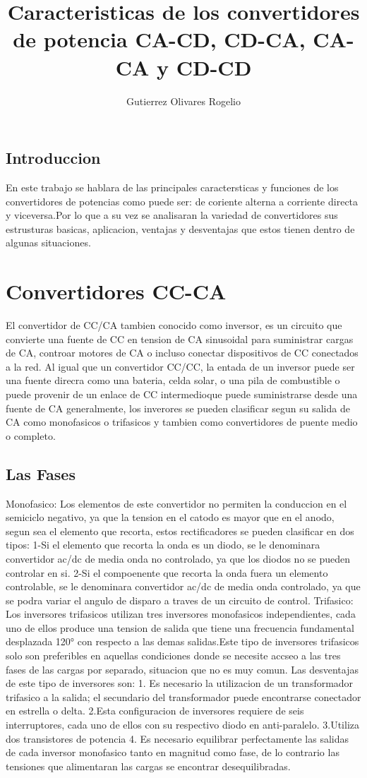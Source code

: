 \documentclass[12pt,a4paper]{report}
\author{Gutierrez Olivares Rogelio}
\title{Caracteristicas de los convertidores de potencia CA-CD, CD-CA, CA-CA y CD-CD}
\begin{document}
\maketitle
\section{Introduccion}
En este trabajo se hablara de las principales caractersticas y funciones de los convertidores de potencias como puede ser: de coriente alterna a corriente directa y viceversa.Por lo que a su vez se analisaran la variedad de convertidores sus estrusturas basicas, aplicacion, ventajas y desventajas que estos tienen dentro de algunas situaciones.
\chapter{Convertidores CC-CA}
El convertidor de CC/CA tambien conocido como inversor, es un circuito que convierte una fuente de CC en tension de CA sinusoidal para suministrar cargas de CA, controar motores de CA o incluso conectar dispositivos de CC conectados a la red. Al igual que un convertidor CC/CC, la entada de un inversor puede ser una fuente direcra como una bateria, celda solar, o una pila de combustible o puede provenir de un enlace de CC intermedioque puede suministrarse desde una fuente de CA generalmente, los inverores se pueden clasificar segun su salida de CA como monofasicos o trifasicos y tambien como convertidores de puente medio o completo.
\section{Las Fases}
Monofasico: 
Los elementos de este convertidor no permiten la conduccion en el semiciclo negativo, ya que la tension en el catodo es mayor que en el anodo, segun sea el elemento que recorta, estos rectificadores se pueden clasificar en dos tipos:
1-Si el elemento que recorta la onda es un diodo, se le denominara convertidor ac/dc de media onda no controlado, ya que los diodos no se pueden controlar en si.
2-Si el compoenente que recorta la onda fuera un elemento controlable, se le denominara convertidor ac/dc de media onda controlado, ya que se podra variar el angulo de disparo a traves de un circuito de control.
Trifasico:
Los inversores trifasicos utilizan tres inversores monofasicos independientes, cada uno de ellos produce una tension de salida que tiene una frecuencia fundamental desplazada 120° con respecto a las demas salidas.Este tipo de inversores trifasicos solo son preferibles en aquellas condiciones donde se necesite accseo a las tres fases de las cargas por separado, situacion que no es muy comun. Las desventajas de este tipo de inversores son:
1. Es necesario la utilizacion de un transformador trifasico a la salida; el secundario del transformador puede encontrarse conectador en estrella o delta.
2.Esta configuracion de inversores requiere de seis interruptores, cada uno de ellos con su respectivo diodo en anti-paralelo.
3.Utiliza dos transistores de potencia
4. Es necesario equilibrar perfectamente las salidas de cada inversor monofasico tanto en magnitud como fase, de lo contrario las tensiones que alimentaran las cargas se encontrar desequilibradas.
\end{document}
